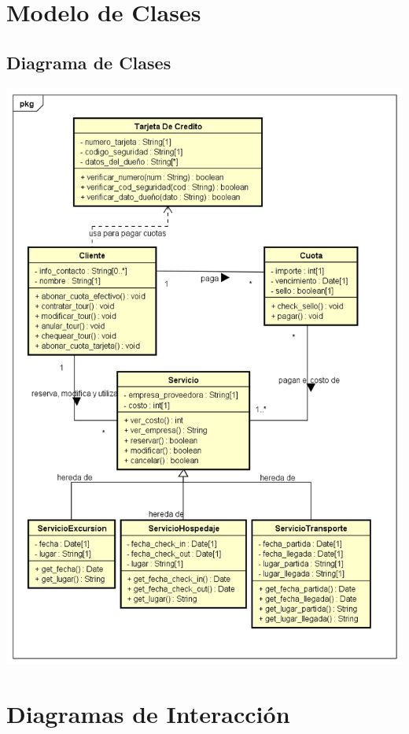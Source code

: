 \documentclass[12pt,a4paper]{article}
\begin{document}
\section{Modelo de Clases}
	\subsection{Diagrama de Clases}
		\includegraphics[scale=0.7]{diagramaDeClases.png}

\section{Diagramas de Interacción}
\end{document}
